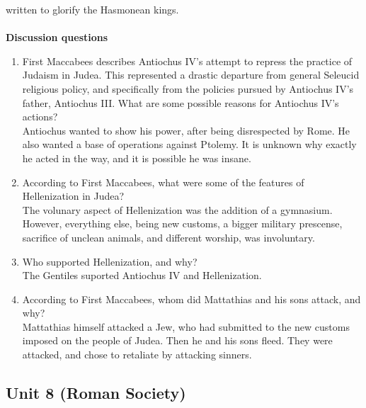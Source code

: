 \documentclass{article}
\begin{document}
written to glorify the Hasmonean kings. \\
\\
\textbf{Discussion questions}
\begin{enumerate}
  \item First Maccabees describes Antiochus IV’s attempt to repress the practice of Judaism
  in Judea. This represented a drastic departure from general Seleucid religious policy, and
  specifically from the policies pursued by Antiochus IV’s father, Antiochus III. What are
  some possible reasons for Antiochus IV’s actions? \\
  Antiochus wanted to show his power, after being disrespected by Rome. He also wanted a
  base of operations against Ptolemy. It is unknown why exactly he acted in the way, and it is
  possible he was insane.
  \item According to First Maccabees, what were some of the features of Hellenization in Judea? \\
  The volunary aspect of Hellenization was the addition of a gymnasium. However, everything
  else, being new customs, a bigger military prescense, sacrifice of unclean animals, and different
  worship, was involuntary.
  \item Who supported Hellenization, and why? \\
  The Gentiles suported Antiochus IV and Hellenization.
  \item According to First Maccabees, whom did Mattathias and his sons attack, and why? \\
  Mattathias himself attacked a Jew, who had submitted to the new customs imposed on the
  people of Judea. Then he and his sons fleed. They were attacked, and chose to retaliate by
  attacking sinners.
\end{enumerate}
\subsection*{Unit 8 (Roman Society)}
\end{document}
